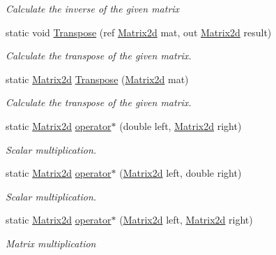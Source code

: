 \begin{DoxyCompactItemize}
\begin{DoxyCompactList}\small\item\em Calculate the inverse of the given matrix \end{DoxyCompactList}\item 
static void \hyperlink{struct_open_t_k_1_1_matrix2d_a5d2ea4cd44ff3f9459518588ebf10443}{Transpose} (ref \hyperlink{struct_open_t_k_1_1_matrix2d}{Matrix2d} mat, out \hyperlink{struct_open_t_k_1_1_matrix2d}{Matrix2d} result)
\begin{DoxyCompactList}\small\item\em Calculate the transpose of the given matrix. \end{DoxyCompactList}\item 
static \hyperlink{struct_open_t_k_1_1_matrix2d}{Matrix2d} \hyperlink{struct_open_t_k_1_1_matrix2d_a9868b4ff28a6f7317103b67dad7eec8e}{Transpose} (\hyperlink{struct_open_t_k_1_1_matrix2d}{Matrix2d} mat)
\begin{DoxyCompactList}\small\item\em Calculate the transpose of the given matrix. \end{DoxyCompactList}\item 
static \hyperlink{struct_open_t_k_1_1_matrix2d}{Matrix2d} \hyperlink{struct_open_t_k_1_1_matrix2d_a88bf4a9a08b1a9dc15104f88ed2a1d7d}{operator$\ast$} (double left, \hyperlink{struct_open_t_k_1_1_matrix2d}{Matrix2d} right)
\begin{DoxyCompactList}\small\item\em Scalar multiplication. \end{DoxyCompactList}\item 
static \hyperlink{struct_open_t_k_1_1_matrix2d}{Matrix2d} \hyperlink{struct_open_t_k_1_1_matrix2d_a96e21c5ddc26caaca11561da5dee3f70}{operator$\ast$} (\hyperlink{struct_open_t_k_1_1_matrix2d}{Matrix2d} left, double right)
\begin{DoxyCompactList}\small\item\em Scalar multiplication. \end{DoxyCompactList}\item 
static \hyperlink{struct_open_t_k_1_1_matrix2d}{Matrix2d} \hyperlink{struct_open_t_k_1_1_matrix2d_a51b1cbdb10ed80ea7073e5f23317719f}{operator$\ast$} (\hyperlink{struct_open_t_k_1_1_matrix2d}{Matrix2d} left, \hyperlink{struct_open_t_k_1_1_matrix2d}{Matrix2d} right)
\begin{DoxyCompactList}\small\item\em Matrix multiplication \end{DoxyCompactList}\item 

\end{DoxyCompactItemize}
